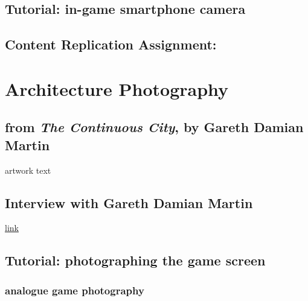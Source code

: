\documentclass[
  openany]{book}
\begin{document}
\hypertarget{tutorial-in-game-smartphone-camera}{%
\section{Tutorial: in-game smartphone camera}\label{tutorial-in-game-smartphone-camera}}

\hypertarget{content-replication-assignment}{%
\section{Content Replication Assignment:}\label{content-replication-assignment}}

\hypertarget{architecture-photography}{%
\chapter{Architecture Photography}\label{architecture-photography}}

\hypertarget{from-the-continuous-city-by-gareth-damian-martin}{%
\section{\texorpdfstring{from \emph{The Continuous City}, by Gareth Damian Martin}{from The Continuous City, by Gareth Damian Martin}}\label{from-the-continuous-city-by-gareth-damian-martin}}

artwork text

\hypertarget{interview-with-gareth-damian-martin}{%
\section{Interview with Gareth Damian Martin}\label{interview-with-gareth-damian-martin}}

\href{https://www.gamescenes.org/2018/04/interview-gareth-damian-martin-the-aesthetics-of-analogue-game-photography.html}{link}

\hypertarget{tutorial-photographing-the-game-screen}{%
\section{Tutorial: photographing the game screen}\label{tutorial-photographing-the-game-screen}}

\hypertarget{analogue-game-photography}{%
\subsection{analogue game photography}\label{analogue-game-photography}}
\end{document}
